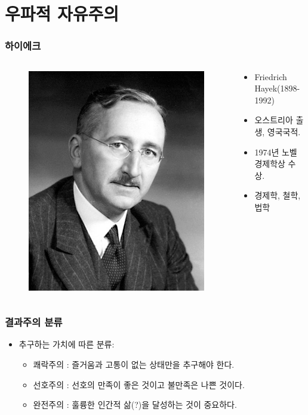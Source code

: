 \documentclass[aspectratio=169,xcolor=dvipsnames,handout]{beamer}
\begin{document}
\section{우파적 자유주의}
\begin{frame}[<+->]
\frametitle{하이에크}
    \begin{columns}
        \begin{column}{.5\textwidth}
            \begin{figure}
                \centering
                \includegraphics[width=.5\textwidth]{pic/Hayek_portrait.jpg}
            \end{figure}
        \end{column}    
        \begin{column}{.5\textwidth}
            \begin{itemize}
            \item Friedrich Hayek(1898-1992)
            \item 오스트리아 출생, 영국국적.
            \item 1974년 노벨 경제학상 수상.
            \item 경제학, 철학, 법학
            \end{itemize}
        \end{column}    
    \end{columns}
\end{frame}

\begin{frame}[<+->]
\frametitle{결과주의 분류}
    \begin{itemize}
        \item 추구하는 가치에 따른 분류:
        \begin{itemize}
            \item 쾌락주의 : 즐거움과 고통이 없는 상태만을 추구해야 한다.
            \item 선호주의 : 선호의 만족이 좋은 것이고 불만족은 나쁜 것이다.
            \item 완전주의 : 훌륭한 인간적 삶(?)을 달성하는 것이 중요하다.
        \end{itemize}
    \end{itemize}
\end{frame}
\end{document}
